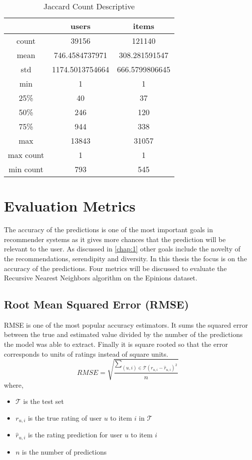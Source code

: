 \begin{table}[H]
\centering
\caption{Jaccard Count Descriptive}
\label{table:jaccard_count_descriptive}
\begin{tabular}{|c|c|c|}
\hline
          & \textbf{users}  & \textbf{items} \\ \hline
count     & 39156           & 121140         \\ \hline
mean      & 746.4584737971  & 308.281591547  \\ \hline
std       & 1174.5013754664 & 666.5799806645 \\ \hline
min       & 1               & 1              \\ \hline
25\%      & 40              & 37             \\ \hline
50\%      & 246             & 120            \\ \hline
75\%      & 944             & 338            \\ \hline
max       & 13843           & 31057          \\ \hline
max count & 1               & 1              \\ \hline
min count & 793             & 545            \\ \hline
\end{tabular}
\end{table}


\section{Evaluation Metrics}
The accuracy of the predictions is one of the most important goals in recommender
systems as it gives more chances that the prediction will be relevant to the
user. As discussed in \autoref{chap:1} other goals include the novelty of the
recommendations, serendipity and diversity. In this thesis the focus is
on the accuracy of the predictions. Four metrics will be discussed to evaluate the
Recursive Nearest Neighbors algorithm on the Epinions dataset.
\subsection{Root Mean Squared Error (RMSE)}
RMSE is one of the most popular accuracy estimators.
It sums the squared error between the true and estimated value divided by the
number of the predictions the model was able to extract. Finally it is square
rooted so that the error corresponds to units of ratings instead of square
units. \citep{Ricci}
$$RMSE = \sqrt{\frac{\sum_{(u,i) \in \mathcal{T}(r_{u,i} - \hat{r}_{u,i})^2}}{n}}$$
where,
\begin{itemize}
	\item[] $\mathcal{T}$ is the test set
	\item[] $r_{u,i}$ is the true rating of user $u$ to item $i$ in $\mathcal{T}$
	\item[] $\hat{r}_{u,i}$ is the rating prediction for user $u$ to item $i$
	\item[] $n$ is the number of predictions
\end{itemize}

